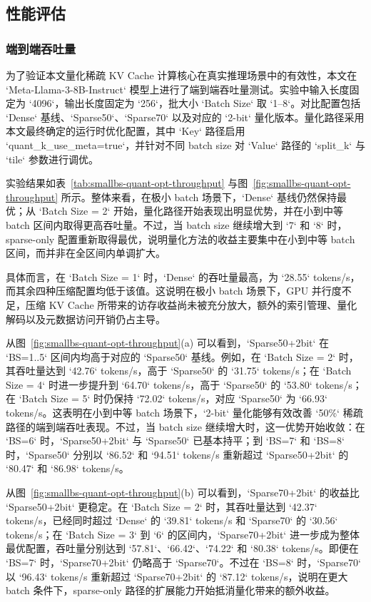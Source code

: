 \subsection{性能评估}
\label{sec:exp:jsqkv:performance}

\subsubsection{端到端吞吐量}

为了验证本文量化稀疏 KV Cache 计算核心在真实推理场景中的有效性，本文在 `Meta-Llama-3-8B-Instruct` 模型上进行了端到端吞吐量测试。实验中输入长度固定为 `4096`，输出长度固定为 `256`，批大小 `Batch Size` 取 `1--8`。对比配置包括 `Dense` 基线、`Sparse50`、`Sparse70` 以及对应的 `2-bit` 量化版本。量化路径采用本文最终确定的运行时优化配置，其中 `Key` 路径启用 `quant_k_use_meta=true`，并针对不同 batch size 对 `Value` 路径的 `split_k` 与 `tile` 参数进行调优。

实验结果如表~\ref{tab:smallbs-quant-opt-throughput} 与图~\ref{fig:smallbs-quant-opt-throughput} 所示。整体来看，在极小 batch 场景下，`Dense` 基线仍然保持最优；从 `Batch Size = 2` 开始，量化路径开始表现出明显优势，并在小到中等 batch 区间内取得更高吞吐量。不过，当 batch size 继续增大到 `7` 和 `8` 时，sparse-only 配置重新取得最优，说明量化方法的收益主要集中在小到中等 batch 区间，而并非在全区间内单调扩大。

具体而言，在 `Batch Size = 1` 时，`Dense` 的吞吐量最高，为 `28.55` tokens/s，而其余四种压缩配置均低于该值。这说明在极小 batch 场景下，GPU 并行度不足，压缩 KV Cache 所带来的访存收益尚未被充分放大，额外的索引管理、量化解码以及元数据访问开销仍占主导。

从图~\ref{fig:smallbs-quant-opt-throughput}(a) 可以看到，`Sparse50+2bit` 在 `BS=1..5` 区间内均高于对应的 `Sparse50` 基线。例如，在 `Batch Size = 2` 时，其吞吐量达到 `42.76` tokens/s，高于 `Sparse50` 的 `31.75` tokens/s；在 `Batch Size = 4` 时进一步提升到 `64.70` tokens/s，高于 `Sparse50` 的 `53.80` tokens/s；在 `Batch Size = 5` 时仍保持 `72.02` tokens/s，对应 `Sparse50` 为 `66.93` tokens/s。这表明在小到中等 batch 场景下，`2-bit` 量化能够有效改善 `50\%` 稀疏路径的端到端吞吐表现。不过，当 batch size 继续增大时，这一优势开始收敛：在 `BS=6` 时，`Sparse50+2bit` 与 `Sparse50` 已基本持平；到 `BS=7` 和 `BS=8` 时，`Sparse50` 分别以 `86.52` 和 `94.51` tokens/s 重新超过 `Sparse50+2bit` 的 `80.47` 和 `86.98` tokens/s。

从图~\ref{fig:smallbs-quant-opt-throughput}(b) 可以看到，`Sparse70+2bit` 的收益比 `Sparse50+2bit` 更稳定。在 `Batch Size = 2` 时，其吞吐量达到 `42.37` tokens/s，已经同时超过 `Dense` 的 `39.81` tokens/s 和 `Sparse70` 的 `30.56` tokens/s；在 `Batch Size = 3` 到 `6` 的区间内，`Sparse70+2bit` 进一步成为整体最优配置，吞吐量分别达到 `57.81`、`66.42`、`74.22` 和 `80.38` tokens/s。即便在 `BS=7` 时，`Sparse70+2bit` 仍略高于 `Sparse70`。不过在 `BS=8` 时，`Sparse70` 以 `96.43` tokens/s 重新超过 `Sparse70+2bit` 的 `87.12` tokens/s，说明在更大 batch 条件下，sparse-only 路径的扩展能力开始抵消量化带来的额外收益。


